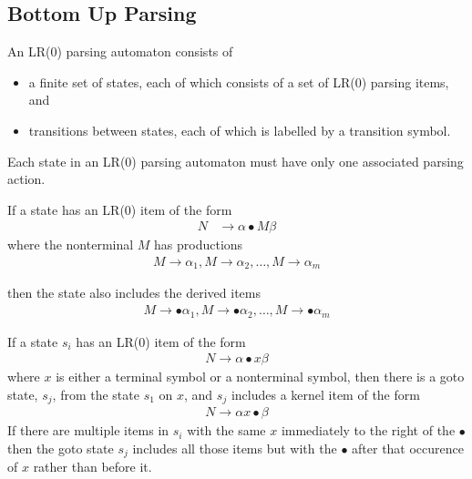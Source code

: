 \subsection{Bottom Up Parsing}

An LR(0) parsing automaton consists of
\begin{itemize}
    \item a finite set of states, each of which consists of a set of LR(0) parsing items, and
    \item transitions between states, each of which is labelled by a transition symbol.
\end{itemize}
Each state in an LR(0) parsing automaton must have only one associated parsing action.

If a state has an LR(0) item of the form
\begin{align*}
    N &\rightarrow \alpha \bullet M \beta
\end{align*}
where the nonterminal $M$ has productions
\begin{align*}
    M \rightarrow \alpha_1, M \rightarrow \alpha_2, \dots, M \rightarrow \alpha_m
\end{align*}

then the state also includes the derived items
\begin{align*}
    M \rightarrow \bullet \alpha_1, M \rightarrow \bullet \alpha_2, \dots, M \rightarrow \bullet \alpha_m
\end{align*}

If a state $s_i$ has an LR(0) item of the form
\begin{align*}
    N \rightarrow \alpha \bullet x \beta
\end{align*}
where $x$ is either a terminal symbol or a nonterminal symbol, then there is a goto state, 
$s_j$, from the state $s_1$ on $x$, and $s_j$ includes a kernel item of the form
\begin{align*}
    N \rightarrow \alpha x \bullet \beta
\end{align*}
If there are multiple items in $s_i$ with the same $x$ immediately to the right of the 
$\bullet$ then the goto state $s_j$ includes all those items but with the $\bullet$ after 
that occurence of $x$ rather than before it.

